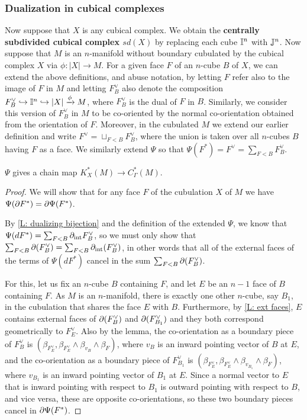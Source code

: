 \subsubsection{Dualization in cubical complexes}

Now suppose that $X$ is any cubical complex. We obtain the \textbf{centrally subdivided cubical complex $sd(X)$} by replacing each cube $\mathbb{I}^n$ with $\mathbb{J}^n$.
Now suppose that $M$ is an $n$-manifold without boundary  cubulated by the cubical complex $X$ via $\phi:|X|\to M$. For a given face $F$ of an $n$-cube $B$ of $X$, we can extend the above definitions, and abuse notation, by letting $F$ refer also to the image of $F$ in $M$ and letting $F_B^\vee$ also denote the composition $F_B^\vee\hookrightarrow \mathbb{I}^n\hookrightarrow |X|\xrightarrow{\phi} M$, where $F_B^\vee$ is the dual of $F$ in $B$. Similarly, we consider this version of $F_B^\vee$ in $M$ to be co-oriented by the normal co-orientation obtained from the orientation of $F$. Moreover, in the cubulated $M$ we extend our earlier definition and write $F^\vee=\sqcup_{F<B} F^\vee_B$, where the union is taken over all $n$-cubes $B$ having $F$ as a face.
We similarly extend $\Psi$ so that  $\Psi(F^*)=F^\vee=\sum_{F<B}  F_{B}^\vee$.

\begin{lemma}\label{L: dual chain map}
$\Psi$ gives a chain map $K_X^*(M)\to C_\Gamma^*(M)$.
\end{lemma}
\begin{proof}
We will show that for any face $F$ of the cubulation $X$ of $M$ we have $\Psi(\partial F^*)=\partial\Psi(F^*)$.

By \cref{L: dualizing bijection} and the definition of the extended $\Psi$, we know that $\Psi(dF^*)=\sum_{F<B} \partial_{\text{int}}F^\vee_B$, so we must only show that $\sum_{F<B} \partial (F^\vee_B)=\sum_{F<B} \partial_{\text{int}}(F^\vee_B)$, in other words that all of the external faces of the terms of  $\Psi(dF^*)$ cancel in the sum  $\sum_{F<B} \partial (F^\vee_B)$.

For this, let us fix an $n$-cube $B$ containing $F$, and let $E$ be an $n-1$ face of $B$ containing $F$. As $M$ is an $n$-manifold, there is exactly one other $n$-cube, say $B_1$, in the cubulation that shares the face $E$ with $B$. Furthermore, by \cref{L: ext faces}, $E$ contains external faces of $\partial(F^\vee_B)$ and $\partial(F^\vee_{B_1})$ and they both correspond geometrically to $F^\vee_E$. Also by the lemma, the co-orientation as a boundary piece of $F^\vee_B$ is $(\beta_{F_E^\vee},\beta_{F_E^\vee}\wedge\beta_{v_B}\wedge \beta_F)$, where $v_B$ is an inward pointing vector of $B$ at $E$, and  the co-orientation as a boundary piece of $F^\vee_{B_1}$ is $(\beta_{F_E^\vee},\beta_{F_E^\vee}\wedge\beta_{v_{B_1}}\wedge \beta_F)$, where $v_{B_1}$ is an inward pointing vector of $B_1$ at $E$. Since a normal vector to $E$ that is inward pointing with respect to $B_1$ is outward pointing with respect to $B$, and vice versa, these are opposite co-orientations, so these two boundary pieces cancel in $\partial \Psi(F^*)$.
\end{proof}

